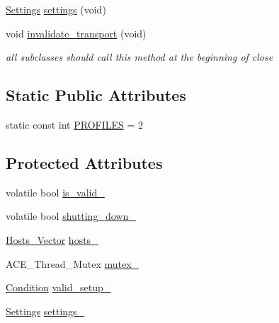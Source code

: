 \begin{DoxyCompactItemize}
\item 
\hyperlink{classMadara_1_1Transport_1_1Settings}{Settings} \hyperlink{classMadara_1_1Transport_1_1Base_a6febe337ae99f9376bdb3ec05899db00}{settings} (void)
\item 
void \hyperlink{classMadara_1_1Transport_1_1Base_a5feac684397b5098708ba9d16e8f1306}{invalidate\_\-transport} (void)
\begin{DoxyCompactList}\small\item\em all subclasses should call this method at the beginning of close \item\end{DoxyCompactList}\end{DoxyCompactItemize}
\subsection*{Static Public Attributes}
\begin{DoxyCompactItemize}
\item 
static const int \hyperlink{classMadara_1_1Transport_1_1Splice__DDS__Transport_a06119964eed25f18948a4d6c68b0e7e8}{PROFILES} = 2
\end{DoxyCompactItemize}
\subsection*{Protected Attributes}
\begin{DoxyCompactItemize}
\item 
volatile bool \hyperlink{classMadara_1_1Transport_1_1Base_a77696ae1c39c0d0edc169882c4b82c23}{is\_\-valid\_\-}
\item 
volatile bool \hyperlink{classMadara_1_1Transport_1_1Base_a6c3d03895e92c93265704052ab707f8a}{shutting\_\-down\_\-}
\item 
\hyperlink{classMadara_1_1Transport_1_1Base_a2957ae0c413e07b7e276ae69ef1c320a}{Hosts\_\-Vector} \hyperlink{classMadara_1_1Transport_1_1Base_a19ac6cbfb41691ad4300a5e696e3b04e}{hosts\_\-}
\item 
ACE\_\-Thread\_\-Mutex \hyperlink{classMadara_1_1Transport_1_1Base_a81479f3b01798d0836dc44629c904450}{mutex\_\-}
\item 
\hyperlink{namespaceMadara_1_1Transport_a5dd6d9a7fb47cdbf2d1448242da4e13d}{Condition} \hyperlink{classMadara_1_1Transport_1_1Base_a82c2a7ef9058b2c9a520d900c9a9f6e0}{valid\_\-setup\_\-}
\item 
\hyperlink{classMadara_1_1Transport_1_1Settings}{Settings} \hyperlink{classMadara_1_1Transport_1_1Base_adafa1a5641aaecae76d963748bddf8e2}{settings\_\-}
\end{DoxyCompactItemize}
